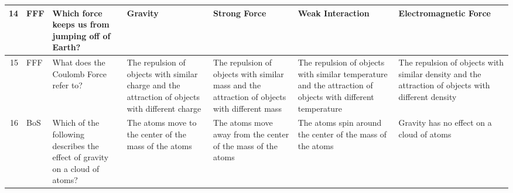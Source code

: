 \documentclass[10pt]{article}
\begin{document}
\begin{tiny}
\begin{longtable}{|r|p{0.375in}|p{1.275in}|p{0.75in}|p{0.75in}|p{0.75in}|p{0.75in}|}
    14    &     FFF &                                                                                                                                                                                                                                  Which force keeps us from jumping off of Earth? &                                                                                                                               Gravity &                                                                                          Strong Force &                                                                                                           Weak Interaction &                                                                                                             Electromagnetic Force \\\hline
    15    &     FFF &                                                                                                                                                                                                                                            What does the Coulomb Force refer to? &                                      The repulsion of objects with similar charge and the attraction of objects with different charge &          The repulsion of objects with similar mass and the attraction of objects with different mass &                 The repulsion of objects with similar temperature and the attraction of objects with different temperature &                                The repulsion of objects with similar density and the attraction of objects with different density \\\hline
    16    &     BoS &                                                                                                                                                                                                      Which of the following describes the effect of gravity on a cloud of atoms? &                                                                                 The atoms move to the center of the mass of the atoms &                                          The atoms move away from the center of the mass of the atoms &                                                                  The atoms spin around the center of the mass of the atoms &                                                                                         Gravity has no effect on a cloud of atoms \\\hline

\end{longtable}
\end{tiny}
\end{document}
